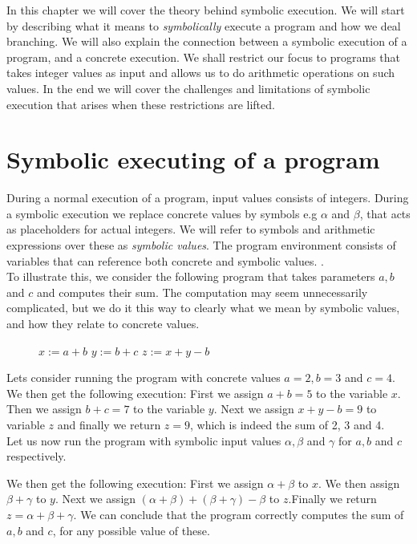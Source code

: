 In this chapter we will cover the theory behind symbolic execution. We will start by describing what it means to \emph{symbolically} execute a program and how we deal branching. We will also explain the connection between a symbolic execution of a program, and a concrete execution. We shall restrict our focus to programs that takes integer values as input and allows us to do arithmetic operations on such values. In the end we will cover the challenges and limitations of symbolic execution that arises when these restrictions are lifted. 


\section{Symbolic executing of a program}
	
	During a normal execution of a program, input values consists of integers. During a symbolic execution we replace concrete values by symbols e.g $\alpha$ and $ \beta$, that acts as placeholders for actual integers. We will refer to symbols and arithmetic expressions over these as \emph{symbolic values}.
	 The program environment consists of variables that can reference both concrete and symbolic values. \cite{CadarSen13} \cite{King76}.
	\\
	To illustrate this, we consider the following program that takes parameters $a, b$ and $ c$ and computes their sum. The computation may seem unnecessarily complicated, but we do it this way to clearly what we mean by symbolic values, and how they relate to concrete values.
	\begin{figure}[!h]
		\begin{algorithmic}
			\State $ x := a + b$
			\State $ y := b + c$
			\State $ z := x + y - b$
			\State {}
			\EndProcedure
		\end{algorithmic}
	\end{figure}

	\sumprogram{}
	\newpage
	Lets consider running the program with concrete values $a = 2, b = 3$ and $c = 4$. We then get the following execution:
	First we assign $a+b = 5$ to the variable $x$. Then we assign $b + c = 7$ to the variable $y$. Next we assign $x + y - b = 9$ to variable $z$ and finally we return $z = 9$, which is indeed the sum of 2, 3 and 4. 
	\\
	Let us now run the program with symbolic input values $\alpha, \beta$ and $\gamma$ for $a, b$ and $c$ respectively. 

	
	We then get the following execution: First we assign $\alpha + \beta$ to $x$. We then assign $\beta + \gamma$ to $y$. Next we assign $(\alpha + \beta) + (\beta + \gamma) - \beta$ to $z$.Finally we return $z = \alpha + \beta + \gamma$. We can conclude that the program correctly computes the sum of $a, b$ and $c$, for any possible value of these.
	
